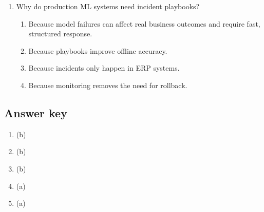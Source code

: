 \begin{enumerate}
  \item Why do production ML systems need incident playbooks?
  \begin{enumerate}
    \item Because model failures can affect real business outcomes and require fast, structured response.
    \item Because playbooks improve offline accuracy.
    \item Because incidents only happen in ERP systems.
    \item Because monitoring removes the need for rollback.
  \end{enumerate}
\end{enumerate}

\subsection*{Answer key}
\begin{enumerate}
  \item (b)
  \item (b)
  \item (b)
  \item (a)
  \item (a)
\end{enumerate}
